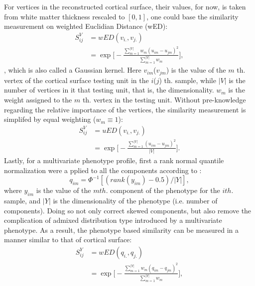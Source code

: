 For vertices in the reconstructed cortical surface, their values, for now, is taken from white matter thickness rescaled to $[0,1]$, one could base the similarity measurement on weighted Euclidian Distance (wED):
\begin{equation} \label{eq:wSV}
\begin{split}
  S_{ij}^V &= wED(v_{i.},v_{j.}) \\
  &= \exp
  {
    \Big[-\frac{\sum_{m=1}^{|V|}{w_m(u_{im}-u_{jm})^2}} {\sum_{m=1}^{|V|}{w_m}}\Big]
  },
\end{split}
\end{equation}
, which is also called a Gaussian kernel. Here $v_{im}$($v_{jm}$) is the value of the $m$ th. vertex of the cortical surface testing unit in the $i$($j$) th. sample, while $|V|$ is the number of vertices in it that testing unit, that is, the dimensionality. $w_m$ is the weight assigned to the $m$ th. vertex in the testing unit. Without pre-knowledge regarding the relative importance of the vertices, the similarity measurement is simplifed by equal weighting ($w_m \equiv 1$):
\begin{equation*} \label{eq_uSV}
\begin{split}
  S_{ij}^V &= uED(v_{i.},v_{j.}) \\
  &= \exp
  {
    \Big[-\frac{\sum_{m=1}^{|V|}{(u_{im}-u_{jm})^2}} {|V|}\Big]
  }.
\end{split}
\end{equation*}
Lastly, for a multivariate phenotype profile, first a rank normal quantile normalization were a
pplied to all the components according to \cite{HWU}:
\begin{displaymath}
  q_{im}=\Phi^{-1}[(rank(y_{im})-0.5)/|Y|],
\end{displaymath} 
where $y_{im}$ is the value of the $m th.$ component of the phenotype for the $i th.$ sample, and $|Y|$ is the dimensionality of the phenotype (i.e. number of components). Doing so not only correct skewed components, but also remove the complication of admixed distribution type introduced by a multivariate phenotype. As a result, the phenotype based similarity can be measured in a manner similar to that of cortical surface:
\begin{equation} \label{eq_wSY}
\begin{split}
  S_{ij}^Y &= wED(q_{i.},q_{j.}) \\
  &=\exp
  {
    \Big[-\frac{\sum_{m=1}^{|Y|}{w_m(q_{im}-q_{jm})^2}} {\sum_{m=1}^{|Y|}{w_m}}\Big]
  },
\end{split}
\end{equation}
